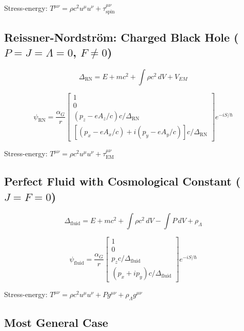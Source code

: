 \documentclass[11pt,a4paper]{article}
\theoremstyle{definition}
\theoremstyle{remark}
\begin{document}
	Stress-energy: $T^{\mu\nu} = \rho c^2 u^\mu u^\nu + \tau^{\mu\nu}_{\mathrm{spin}}$
	
	\subsection{Reissner-Nordstr\"om: Charged Black Hole ($P=J=\Lambda=0$, $F\neq0$)}
	
	\begin{equation}
		\Delta_{\mathrm{RN}} = E + mc^2 + \int\rho c^2\,dV + V_{EM}
	\end{equation}
	
	\begin{equation}
		\psi_{\mathrm{RN}} = \frac{\alpha_G}{r}\begin{bmatrix}1\\0\\ (p_z-eA_z/c)c/\Delta_{\mathrm{RN}}\\ [(p_x-eA_x/c)+i(p_y-eA_y/c)]c/\Delta_{\mathrm{RN}}\end{bmatrix}e^{-iS/\hbar}
	\end{equation}
	
	Stress-energy: $T^{\mu\nu} = \rho c^2 u^\mu u^\nu + \tau^{\mu\nu}_{\mathrm{EM}}$
	
	\subsection{Perfect Fluid with Cosmological Constant ($J=F=0$)}
	
	\begin{equation}
		\Delta_{\mathrm{fluid}} = E + mc^2 + \int\rho c^2\,dV - \int P\,dV + \rho_\Lambda
	\end{equation}
	
	\begin{equation}
		\psi_{\mathrm{fluid}} = \frac{\alpha_G}{r}\begin{bmatrix}1\\0\\ p_zc/\Delta_{\mathrm{fluid}}\\ (p_x+ip_y)c/\Delta_{\mathrm{fluid}}\end{bmatrix}e^{-iS/\hbar}
	\end{equation}
	
	Stress-energy: $T^{\mu\nu} = \rho c^2 u^\mu u^\nu + Pg^{\mu\nu} + \rho_\Lambda g^{\mu\nu}$
	
	\subsection{Most General Case}
	
\end{document}
